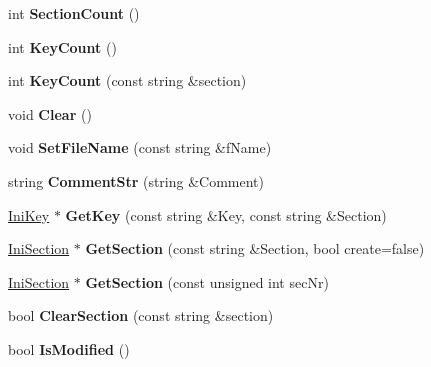 \begin{DoxyCompactItemize}
\item 
\hypertarget{classrr_1_1_ini_file_ac2a8d85c165534b6350533bd844761a8}{int {\bfseries Section\-Count} ()}\label{classrr_1_1_ini_file_ac2a8d85c165534b6350533bd844761a8}

\item 
\hypertarget{classrr_1_1_ini_file_a59f519adcc0465241665e11a738b9c27}{int {\bfseries Key\-Count} ()}\label{classrr_1_1_ini_file_a59f519adcc0465241665e11a738b9c27}

\item 
\hypertarget{classrr_1_1_ini_file_a3da1a03fddc95c1415f3adc57bd706ae}{int {\bfseries Key\-Count} (const string \&section)}\label{classrr_1_1_ini_file_a3da1a03fddc95c1415f3adc57bd706ae}

\item 
\hypertarget{classrr_1_1_ini_file_a16b14b66bb99a33ef9a1f63208243c24}{void {\bfseries Clear} ()}\label{classrr_1_1_ini_file_a16b14b66bb99a33ef9a1f63208243c24}

\item 
\hypertarget{classrr_1_1_ini_file_a11b30f1eaaebf63eecf83bbe71b7c792}{void {\bfseries Set\-File\-Name} (const string \&f\-Name)}\label{classrr_1_1_ini_file_a11b30f1eaaebf63eecf83bbe71b7c792}

\item 
\hypertarget{classrr_1_1_ini_file_a0b35fb7a348df800676fc71eca8be989}{string {\bfseries Comment\-Str} (string \&Comment)}\label{classrr_1_1_ini_file_a0b35fb7a348df800676fc71eca8be989}

\item 
\hypertarget{classrr_1_1_ini_file_ae00212a8f80890e04fc0d54edab53860}{\hyperlink{classrr_1_1_ini_key}{Ini\-Key} $\ast$ {\bfseries Get\-Key} (const string \&Key, const string \&Section)}\label{classrr_1_1_ini_file_ae00212a8f80890e04fc0d54edab53860}

\item 
\hypertarget{classrr_1_1_ini_file_af1c349158b375e19f73be3e86119e3ff}{\hyperlink{classrr_1_1_ini_section}{Ini\-Section} $\ast$ {\bfseries Get\-Section} (const string \&Section, bool create=false)}\label{classrr_1_1_ini_file_af1c349158b375e19f73be3e86119e3ff}

\item 
\hypertarget{classrr_1_1_ini_file_a4d569729086baaed36eb80bb2acd1dd6}{\hyperlink{classrr_1_1_ini_section}{Ini\-Section} $\ast$ {\bfseries Get\-Section} (const unsigned int sec\-Nr)}\label{classrr_1_1_ini_file_a4d569729086baaed36eb80bb2acd1dd6}

\item 
\hypertarget{classrr_1_1_ini_file_a855673a5b2c81c72cd60cc6ac58c05ef}{bool {\bfseries Clear\-Section} (const string \&section)}\label{classrr_1_1_ini_file_a855673a5b2c81c72cd60cc6ac58c05ef}

\item 
\hypertarget{classrr_1_1_ini_file_aee0e075188471d394dad72f73a105f04}{bool {\bfseries Is\-Modified} ()}\label{classrr_1_1_ini_file_aee0e075188471d394dad72f73a105f04}

\end{DoxyCompactItemize}
